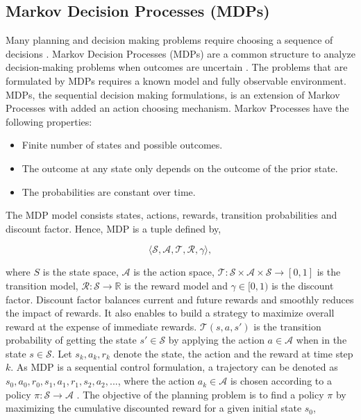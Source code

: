 \documentclass{ituphdreport}
\begin{document}
\subsection{Markov Decision Processes (MDPs)} \label{sec:mdp}
Many planning and decision making problems require choosing a sequence of decisions \cite{kochenderfer2015decision}. Markov Decision Processes (MDPs) are a common structure to analyze decision-making problems when outcomes are uncertain \cite{puterman2014markov}. The problems that are formulated by MDPs requires a known model and fully observable environment. MDPs, the sequential decision making formulations, is an extension of Markov Processes with added an action choosing mechanism. Markov Processes have the following properties:
\begin{itemize}
	\item Finite number of states and possible outcomes.
	\item The outcome at any state only depends on the outcome of the prior state.
	\item The probabilities are constant over time.
\end{itemize}

The MDP model consists states, actions, rewards, transition probabilities and discount factor. Hence, MDP is a tuple defined by,

\begin{equation}
\label{eq:mdptuple}
\mathcal {\langle  S, A, T, R,\gamma \rangle}, 
\end{equation}

where $S$ is the state space, $\mathcal A$ is the action space, $\mathcal{ T: S \times A \times S \rightarrow} [0,1]$ is the transition model, $\mathcal{R:S\rightarrow}\mathbb{R}$ is the reward model and $\gamma \in [0,1)$ is the discount factor. Discount factor balances current and future rewards and smoothly reduces the impact of rewards. It also enables to build a strategy to maximize overall reward at the expense of immediate rewards. $\mathcal{T}(s,a,s')$ is the transition probability of getting the state $s' \in \mathcal{S}$ by applying the action $a \in \mathcal{A}$ when in the state $s \in \mathcal{S}$. Let $s_k, a_k, r_k$ denote the state, the action and the reward at time step $k$. As MDP is a sequential control formulation, a trajectory can be denoted as $s_0, a_0, r_0, s_1, a_1, r_1, s_2, a_2, ...$, where the action $a_k \in \mathcal{A}$ is chosen according to a policy $\pi : \mathcal{S \rightarrow A}$ \cite{toksoz2012design}. The objective of the planning problem is to find a policy $\pi$ by maximizing the cumulative discounted reward for a given initial state $s_0$,
\end{document}
